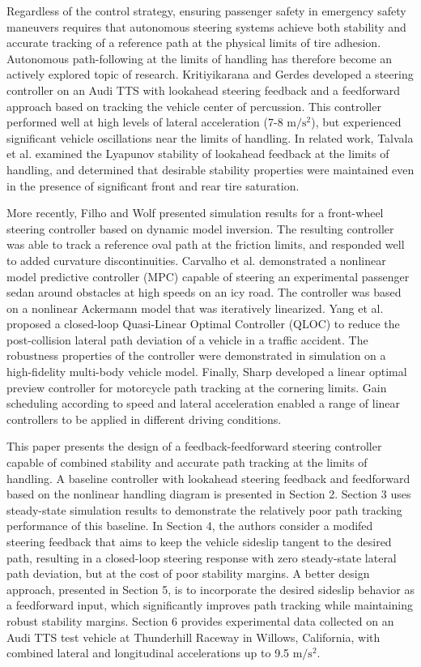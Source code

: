 \documentclass{nVSD2e}
\theoremstyle{plain}
\theoremstyle{definition}
\theoremstyle{remark}
\begin{document}
Regardless of the control strategy, ensuring passenger safety in emergency safety maneuvers requires that autonomous steering 
systems achieve both stability and accurate tracking of a reference path at the physical limits of tire adhesion. Autonomous path-following at the limits of handling has therefore become an actively explored topic of research. Kritiyikarana
 and Gerdes \cite{mickcop} developed a steering controller on an Audi TTS with lookahead steering feedback and a feedforward approach based on
 tracking the vehicle center of percussion. This controller performed well at high levels of lateral acceleration (7-8 $\mathrm{m/s^2}$),
 but experienced significant vehicle oscillations near the limits of handling. In related work, Talvala et al.  \cite{talvala} examined the Lyapunov stability of lookahead feedback
at the limits of handling, and determined that desirable stability properties were maintained
even in the presence of significant front and rear tire saturation. 

More recently, Filho and Wolf \cite{filho14} presented simulation results for a front-wheel steering controller based on dynamic model inversion. The resulting controller was able to track a reference oval path at the friction limits, and responded well
to added curvature discontinuities. Carvalho et al. \cite{carvalho13} demonstrated a nonlinear model predictive controller (MPC) 
capable of steering an experimental passenger sedan around obstacles at high speeds on an icy road. The controller was based 
on a nonlinear Ackermann model that was iteratively linearized. Yang et al. \cite{yang14} proposed a closed-loop Quasi-Linear Optimal Controller (QLOC) to reduce the post-collision lateral path deviation of a vehicle
in a traffic accident. The robustness properties of the controller were demonstrated in simulation on a high-fidelity multi-body vehicle model. Finally, Sharp \cite{sharp10} developed a linear optimal preview controller
for motorcycle path tracking at the cornering limits. Gain scheduling according to speed and lateral acceleration enabled a range of linear controllers to be applied in different driving conditions.
 
 This paper presents the design of a feedback-feedforward steering controller capable of combined stability and accurate path tracking at the limits of handling. 
 A baseline controller with lookahead steering feedback and feedforward based on the nonlinear handling diagram is presented in Section 2. 
Section 3 uses steady-state simulation results to demonstrate the relatively poor path tracking performance of this baseline. In Section 4, the authors 
consider a modifed steering feedback that aims to keep the vehicle sideslip tangent to the desired path, resulting in a closed-loop steering
response with zero steady-state lateral path deviation, but at the cost of poor stability margins. A better design approach, presented in Section 5, is to incorporate the desired sideslip behavior
as a feedforward input, which significantly improves path tracking while maintaining robust stability margins. Section 6 provides experimental data collected
on an Audi TTS test vehicle at Thunderhill Raceway in Willows, California, with combined lateral and longitudinal accelerations up to 9.5 $\mathrm{m/s^2}$.
\end{document}
